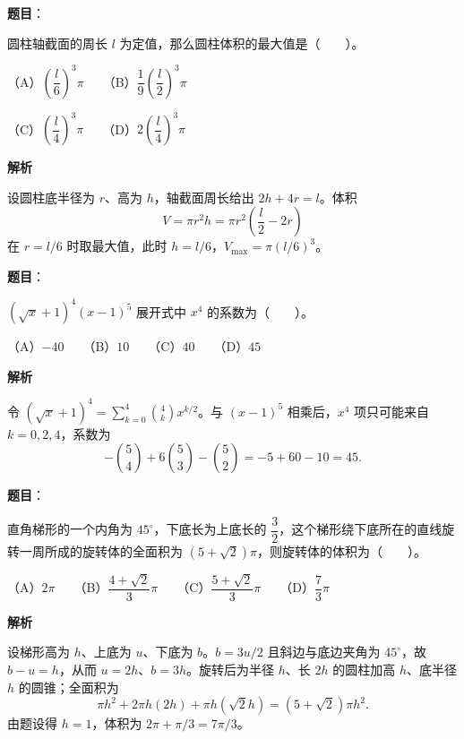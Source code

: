 \begin{answer}

\textbf{题目}：

圆柱轴截面的周长 $l$ 为定值，那么圆柱体积的最大值是\mbox{（　　）}。

（A）$\left(\dfrac l6\right)^3\pi$　　（B）$\dfrac19\left(\dfrac l2\right)^3\pi$

（C）$\left(\dfrac l4\right)^3\pi$　　（D）$2\left(\dfrac l4\right)^3\pi$

\textbf{解析}

设圆柱底半径为 $r$、高为 $h$，轴截面周长给出 $2h+4r=l$。体积
\nopagebreak[4]
\[
V=\pi r^2h=\pi r^2\left(\frac l2-2r\right)
\]
在 $r=l/6$ 时取最大值，此时 $h=l/6$，$V_{\max}=\pi(l/6)^3$。


\end{answer}
\begin{answer}

\textbf{题目}：

$(\sqrt{x}+1)^4(x-1)^5$ 展开式中 $x^4$ 的系数为\mbox{（　　）}。

（A）$-40$　　（B）$10$　　（C）$40$　　（D）$45$

\textbf{解析}

 令 $(\sqrt{x}+1)^4=\sum_{k=0}^4\binom4k x^{k/2}$。与 $(x-1)^5$ 相乘后，$x^4$ 项只可能来自 $k=0,2,4$，系数为
\nopagebreak[4]
\[
-\binom54+6\binom53-\binom52=-5+60-10=45.
\]


\end{answer}
\begin{answer}

\textbf{题目}：

直角梯形的一个内角为 $45^\circ$，下底长为上底长的 $\dfrac32$，这个梯形绕下底所在的直线旋转一周所成的旋转体的全面积为 $(5+\sqrt2)\pi$，则旋转体的体积为\mbox{（　　）}。

（A）$2\pi$　　（B）$\dfrac{4+\sqrt2}{3}\pi$　　（C）$\dfrac{5+\sqrt2}{3}\pi$　　（D）$\dfrac73\pi$

\textbf{解析}

设梯形高为 $h$、上底为 $u$、下底为 $b$。$b=3u/2$ 且斜边与底边夹角为 $45^\circ$，故 $b-u=h$，从而 $u=2h$、$b=3h$。旋转后为半径 $h$、长 $2h$ 的圆柱加高 $h$、底半径 $h$ 的圆锥；全面积为
\nopagebreak[4]
\[
\pi h^2+2\pi h(2h)+\pi h(\sqrt2h)=(5+\sqrt2)\pi h^2.
\]
由题设得 $h=1$，体积为 $2\pi+\pi/3=7\pi/3$。


\end{answer}
